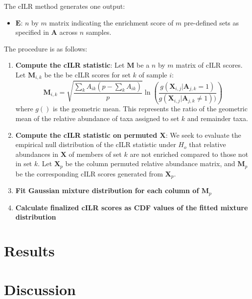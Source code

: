 \documentclass[
]{article}
\providecommand{\tightlist}{%
  \setlength{\itemsep}{0pt}\setlength{\parskip}{0pt}}
\begin{document}
The cILR method generates one output:

\begin{itemize}
\tightlist
\item
  \(\mathbf{E}\): \(n\) by \(m\) matrix indicating the enrichment score
  of \(m\) pre-defined sets as specified in \(\mathbf{A}\) across \(n\)
  samples.
\end{itemize}

The procedure is as follows:

\begin{enumerate}
\def\labelenumi{\arabic{enumi}.}
\tightlist
\item
  \textbf{Compute the cILR statistic}: Let \(\mathbf{M}\) be a \(n\) by
  \(m\) matrix of cILR scores. Let \(\mathbf{M}_{i,k}\) be the be cILR
  scores for set \(k\) of sample \(i\):\\
  \[\mathbf{M}_{i,k} = \sqrt{\frac{\sum_k A_{ik}(p - \sum_k A_{ik})}{p}} \ln \left( \frac{g(\mathbf{X}_{i,j}|\mathbf{A}_{j,k} = 1)}{g(\mathbf{X}_{i,j}|\mathbf{A}_{j,k} \neq 1))} \right)\]
  where \(g()\) is the geometric mean. This represents the ratio of the
  geometric mean of the relative abundance of taxa assigned to set \(k\)
  and remainder taxa.
\item
  \textbf{Compute the cILR statistic on permuted \(\mathbf{X}\)}: We
  seek to evaluate the empirical null distribution of the cILR statistic
  under \(H_o\) that relative abundances in \(\mathbf{X}\) of members of
  set \(k\) are not enriched compared to those not in set \(k\). Let
  \(\mathbf{X}_p\) be the column permuted relative abundance matrix, and
  \(\mathbf{M}_p\) be the corresponding cILR scores generated from
  \(\mathbf{X}_p\).\\
\item
  \textbf{Fit Gaussian mixture distribution for each column of
  \(\mathbf{M}_p\)}
\item
  \textbf{Calculate finalized cILR scores as CDF values of the fitted
  mixture distribution}
\end{enumerate}

\hypertarget{results}{%
\section{Results}\label{results}}

\hypertarget{discussion}{%
\section{Discussion}\label{discussion}}
\end{document}
